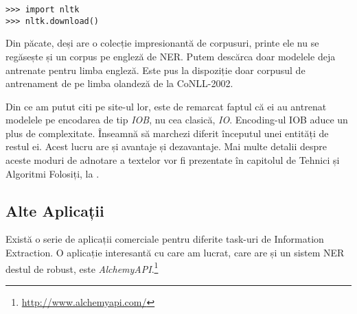 \lstset{language=python,caption=Python NLTK,label=lst:python-nltk}
\begin{lstlisting}
>>> import nltk
>>> nltk.download()
\end{lstlisting}


Din păcate, deși are o colecție impresionantă de corpusuri, printe ele nu se regăsește și un corpus pe engleză de NER. Putem descărca doar modelele deja antrenate pentru limba engleză. Este pus la dispoziție doar corpusul de antrenament de pe limba olandeză de la CoNLL-2002.

Din ce am putut citi pe site-ul lor, este de remarcat faptul că ei au antrenat modelele pe encodarea de tip \textit{IOB}, nu cea clasică, \textit{IO}. Encoding-ul IOB aduce un plus de complexitate. Înseamnă să marchezi diferit începutul unei entități de restul ei. Acest lucru are și avantaje și dezavantaje. Mai multe detalii despre aceste moduri de adnotare a textelor vor fi prezentate în capitolul de Tehnici și Algoritmi Folosiți, la  .

\subsection{Alte Aplicații}

Există o serie de aplicații comerciale pentru diferite task-uri de Information Extraction. O aplicație interesantă cu care am lucrat, care are și un sistem NER destul de robust, este \textit{AlchemyAPI}.\footnote{\url{http://www.alchemyapi.com/}}


















